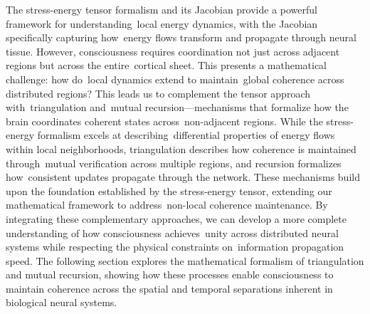The stress-energy tensor formalism and its Jacobian provide a powerful framework for understanding~local energy dynamics, with the Jacobian specifically capturing how~energy flows transform and propagate through neural tissue. However, consciousness requires coordination not just across adjacent regions but across the entire~cortical sheet. This presents a mathematical challenge: how do~local dynamics extend to maintain~global coherence across distributed regions? This leads us to complement the tensor approach with~triangulation and~mutual recursion—mechanisms that formalize how the brain coordinates coherent states across~non-adjacent regions. While the stress-energy formalism excels at describing~differential properties of energy flows within local neighborhoods, triangulation describes how coherence is maintained through~mutual verification across multiple regions, and recursion formalizes how~consistent updates propagate through the network. These mechanisms build upon the foundation established by the stress-energy tensor, extending our mathematical framework to address~non-local coherence maintenance. By integrating these complementary approaches, we can develop a more complete understanding of how consciousness achieves~unity across distributed neural systems while respecting the physical constraints on~information propagation speed. The following section explores the mathematical formalism of triangulation and mutual recursion, showing how these processes enable consciousness to maintain coherence across the spatial and temporal separations inherent in biological neural systems.
